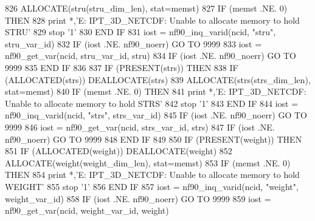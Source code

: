 \begin{DoxyCode}
826         \textcolor{keyword}{ALLOCATE}(stru(stru\_dim\_len), stat=memst)
827         \textcolor{keywordflow}{IF} (memst .NE. 0) \textcolor{keywordflow}{THEN}
828             print *,\textcolor{stringliteral}{'E: IPT\_3D\_NETCDF: Unable to allocate memory to hold STRU'}
829             stop \textcolor{stringliteral}{'1'}
830 \textcolor{keywordflow}{        END IF}
831         iost = nf90\_inq\_varid(ncid, \textcolor{stringliteral}{"stru"}, stru\_var\_id)
832         \textcolor{keywordflow}{IF} (iost .NE. nf90\_noerr) \textcolor{keywordflow}{GO TO} 9999
833         iost = nf90\_get\_var(ncid, stru\_var\_id, stru)
834         \textcolor{keywordflow}{IF} (iost .NE. nf90\_noerr) \textcolor{keywordflow}{GO TO} 9999
835 \textcolor{keywordflow}{    END IF}
836 
837     \textcolor{keywordflow}{IF} (\textcolor{keyword}{PRESENT}(strs)) \textcolor{keywordflow}{THEN}
838         \textcolor{keywordflow}{IF} (\textcolor{keyword}{ALLOCATED}(strs))        \textcolor{keyword}{DEALLOCATE}(strs)
839         \textcolor{keyword}{ALLOCATE}(strs(strs\_dim\_len), stat=memst)
840         \textcolor{keywordflow}{IF} (memst .NE. 0) \textcolor{keywordflow}{THEN}
841             print *,\textcolor{stringliteral}{'E: IPT\_3D\_NETCDF: Unable to allocate memory to hold STRS'}
842             stop \textcolor{stringliteral}{'1'}
843 \textcolor{keywordflow}{        END IF}
844         iost = nf90\_inq\_varid(ncid, \textcolor{stringliteral}{"strs"}, strs\_var\_id)
845         \textcolor{keywordflow}{IF} (iost .NE. nf90\_noerr) \textcolor{keywordflow}{GO TO} 9999
846         iost = nf90\_get\_var(ncid, strs\_var\_id, strs)
847         \textcolor{keywordflow}{IF} (iost .NE. nf90\_noerr) \textcolor{keywordflow}{GO TO} 9999
848 \textcolor{keywordflow}{    END IF}
849 
850     \textcolor{keywordflow}{IF} (\textcolor{keyword}{PRESENT}(weight)) \textcolor{keywordflow}{THEN}
851         \textcolor{keywordflow}{IF} (\textcolor{keyword}{ALLOCATED}(weight))        \textcolor{keyword}{DEALLOCATE}(weight)
852         \textcolor{keyword}{ALLOCATE}(weight(weight\_dim\_len), stat=memst)
853         \textcolor{keywordflow}{IF} (memst .NE. 0) \textcolor{keywordflow}{THEN}
854             print *,\textcolor{stringliteral}{'E: IPT\_3D\_NETCDF: Unable to allocate memory to hold WEIGHT'}
855             stop \textcolor{stringliteral}{'1'}
856 \textcolor{keywordflow}{        END IF}
857         iost = nf90\_inq\_varid(ncid, \textcolor{stringliteral}{"weight"}, weight\_var\_id)
858         \textcolor{keywordflow}{IF} (iost .NE. nf90\_noerr) \textcolor{keywordflow}{GO TO} 9999
859         iost = nf90\_get\_var(ncid, weight\_var\_id, weight)

\end{DoxyCode}
